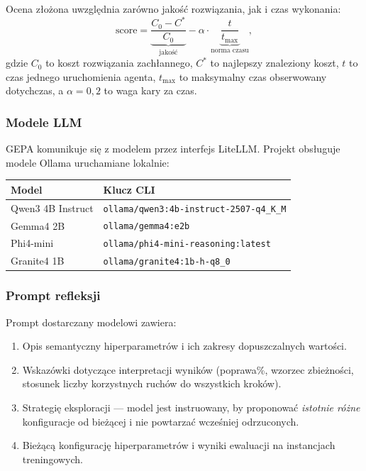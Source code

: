 \documentclass[11pt,a4paper]{article}
\begin{document}
Ocena złożona uwzględnia zarówno jakość rozwiązania, jak i czas wykonania:
\begin{equation}
  \text{score} = \underbrace{\frac{C_0 - C^*}{C_0}}_{\text{jakość}}
               - \alpha \cdot \underbrace{\frac{t}{t_{\max}}}_{\text{norma czasu}},
  \label{eq:score}
\end{equation}
gdzie $C_0$ to koszt rozwiązania zachłannego, $C^*$ to najlepszy znaleziony
koszt, $t$ to czas jednego uruchomienia agenta, $t_{\max}$ to maksymalny
czas obserwowany dotychczas, a $\alpha = 0{,}2$ to waga kary za czas.

\subsubsection*{Modele LLM}

GEPA komunikuje się z modelem przez interfejs LiteLLM.
Projekt obsługuje modele Ollama uruchamiane lokalnie:

\begin{center}
\begin{tabular}{@{}ll@{}}
\toprule
\textbf{Model} & \textbf{Klucz CLI} \\
\midrule
Qwen3 4B Instruct  & \texttt{ollama/qwen3:4b-instruct-2507-q4\_K\_M} \\
Gemma4 2B          & \texttt{ollama/gemma4:e2b} \\
Phi4-mini          & \texttt{ollama/phi4-mini-reasoning:latest} \\
Granite4 1B        & \texttt{ollama/granite4:1b-h-q8\_0} \\
\bottomrule
\end{tabular}
\end{center}

\subsubsection*{Prompt refleksji}

Prompt dostarczany modelowi zawiera:
\begin{enumerate}[noitemsep]
  \item Opis semantyczny hiperparametrów i ich zakresy dopuszczalnych wartości.
  \item Wskazówki dotyczące interpretacji wyników (poprawa\%, wzorzec zbieżności,
        stosunek liczby korzystnych ruchów do wszystkich kroków).
  \item Strategię eksploracji — model jest instruowany, by proponować
        \emph{istotnie różne} konfiguracje od bieżącej i nie powtarzać
        wcześniej odrzuconych.
  \item Bieżącą konfigurację hiperparametrów i wyniki ewaluacji na instancjach
        treningowych.
\end{enumerate}
\end{document}
